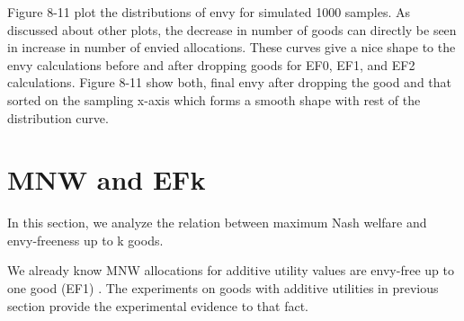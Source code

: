 

Figure 8-11 plot the distributions of envy for simulated 1000 samples. As discussed about other plots, the decrease in number of goods can directly be seen in increase in number of envied allocations. These curves give a nice shape to the envy calculations before and after dropping goods for EF0, EF1, and EF2 calculations. Figure 8-11 show both, final envy after dropping the good and that sorted on the sampling x-axis which forms a smooth shape with rest of the distribution curve.


\section{MNW and EFk}
\label{section_proof}
In this section, we analyze the relation between maximum Nash welfare and envy-freeness up to k goods.

We already know MNW allocations for additive utility values are envy-free up to one good (EF1) \cite{caragiannis2016unreasonable}. The experiments on goods with additive utilities in previous section provide the experimental evidence to that fact.

